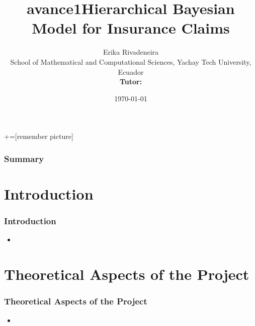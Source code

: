 \documentclass[10pt]{beamer} %
\title{avance1}
\title{Hierarchical Bayesian Model for Insurance Claims}
\author[]{Erika Rivadeneira\\ School of Mathematical and Computational Sciences, Yachay Tech University, Ecuador
\vspace{0.25cm}
\\{\small{\textbf{Tutor:} }}}
\date{\today}
\begin{document}
+=[remember picture]
\lstset{}   
\everymath{\displaystyle}

\begin{frame}
	\titlepage
\end{frame}

\begin{frame}
\frametitle{Summary}
\tableofcontents
\end{frame}

\section{Introduction}

\begin{frame}
\frametitle[9pt]{Introduction}
\begin{itemize}
    \item 
    
\end{itemize}

\end{frame}


\section{Theoretical Aspects of the Project}
\begin{frame}
\frametitle[9pt]{Theoretical Aspects of the Project}

\begin{itemize}
    \item 
\end{itemize}
\end{frame}

\end{document}
